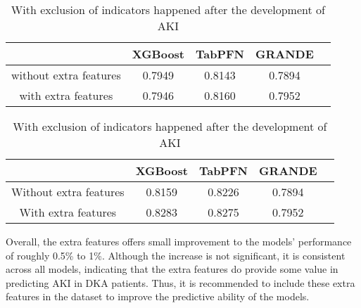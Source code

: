 \documentclass[../main.tex]{subfiles}
\begin{document}
\begin{table}[H]
    \centering
    \caption{AUC-ROC of tabular-based models with and without extra features}
    \label{tab:extra-features}

    \begin{subtable}{\textwidth}
        \centering
        \caption{Without exclusion of indicators happened after the development of AKI}
        \label{tab:extra-features-no-exclusion}
        \begin{tabular}{|c|c|c|c|c|}
            \hline
            \textbf{} & 
            \textbf{XGBoost} & 
            \textbf{TabPFN} & 
            \textbf{GRANDE} \\
            \hline

            without extra features & 
            0.7949 & 
            0.8143 & 
            0.7894 \\

            with extra features & 
            0.7946 & 
            0.8160 & 
            0.7952 \\

            \hline
        \end{tabular}
    \end{subtable}
    
    \vspace{1cm}

    \begin{subtable}{\textwidth}
        \centering
        \caption{With exclusion of indicators happened after the development of AKI}
        \label{tab:extra-features-exclusion}
        \begin{tabular}{|c|c|c|c|c|}
            \hline
            \textbf{} & 
            \textbf{XGBoost} & 
            \textbf{TabPFN} & 
            \textbf{GRANDE} \\
            \hline

            Without extra features & 
            0.8159 & 
            0.8226 & 
            0.7894 \\

            With extra features & 
            0.8283 & 
            0.8275 & 
            0.7952 \\

            \hline
        \end{tabular}
    \end{subtable}

\end{table}

Overall, the extra features offers small improvement to the models' performance of roughly 0.5\% to 1\%.
Although the increase is not significant, it is consistent across all models, indicating that the extra features do provide some value in predicting AKI in DKA patients.
Thus, it is recommended to include these extra features in the dataset to improve the predictive ability of the models.
\end{document}
